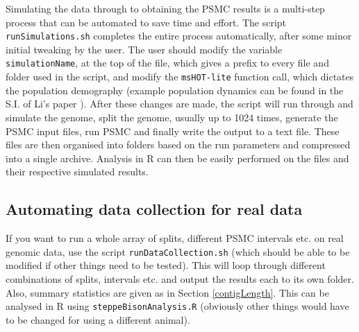 \documentclass[11pt,a4paper]{article}
\begin{document}
Simulating the data through to obtaining the PSMC results is a multi-step process that can be automated to save time and effort. The script \verb|runSimulations.sh| completes the entire process automatically, after some minor initial tweaking by the user. The user should modify the variable \verb|simulationName|, at the top of the file, which gives a prefix to every file and folder used in the script, and modify the \verb|msHOT-lite| function call, which dictates the population demography (example population dynamics can be found in the S.I. of Li's paper \cite{li2011inference}). After these changes are made, the script will run through and simulate the genome, split the genome, usually up to 1024 times, generate the PSMC input files, run PSMC and finally write the output to a text file. These files are then organised into folders based on the run parameters and compressed into a single archive. Analysis in R can then be easily performed on the files and their respective simulated results.

\subsection{Automating data collection for real data}
If you want to run a whole array of splits, different PSMC intervals etc. on real genomic data, use the script \verb|runDataCollection.sh| (which should be able to be modified if other things need to be tested). This will loop through different combinations of splits, intervals etc. and output the results each to its own folder. Also, summary statistics are given as in Section \ref{contigLength}. This can be analysed in R using \verb|steppeBisonAnalysis.R| (obviously other things would have to be changed for using a different animal).
\end{document}
